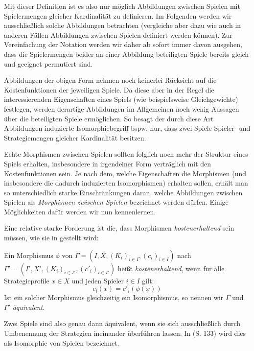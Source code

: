 \begin{beob}
	Mit dieser Definition ist es also nur möglich Abbildungen zwischen Spielen mit Spielermengen gleicher Kardinalität zu definieren. Im Folgenden werden wir ausschließlich solche Abbildungen betrachten (vergleiche aber  dazu wie auch in anderen Fällen Abbildungen zwischen Spielen definiert werden können). Zur Vereinfachung der Notation werden wir daher ab sofort immer davon ausgehen, dass die Spielermengen beider an einer Abbildung beteiligten Spiele bereits gleich und geeignet permutiert sind.
\end{beob}

Abbildungen der obigen Form nehmen noch keinerlei Rücksicht auf die Kostenfunktionen der jeweiligen Spiele. Da diese aber in der Regel die interessierenden Eigenschaften eines Spiels (wie beispielsweise Gleichgewichte) festlegen, werden derartige Abbildungen im Allgemeinen noch wenig Aussagen über die beteiligten Spiele ermöglichen. So besagt der durch diese Art Abbildungen induzierte Isomorphiebegriff bspw. nur, dass zwei Spiele Spieler- und Strategiemengen gleicher Kardinalität besitzen.

Echte Morphismen zwischen Spielen sollten folglich noch mehr der Struktur eines Spiels erhalten, insbesondere in irgendeiner Form \glqq verträglich\grqq{} mit den Kostenfunktionen sein. Je nach dem, welche Eigenschaften die Morphismen (und insbesondere die dadurch induzierten Isomorphismen) erhalten sollen, erhält man so unterschiedlich starke Einschränkungen daran, welche Abbildungen zwischen Spielen als \emph{Morphismen zwischen Spielen} bezeichnet werden dürfen. Einige Möglichkeiten dafür werden wir nun kennenlernen.

Eine relative starke Forderung ist die, dass Morphismen \emph{kostenerhaltend} sein müssen, wie sie in \cite{ReprOfFiniteGamesAsNCG} gestellt wird:

\begin{defn}
	Ein Morphismus $\phi$ von $\Gamma = (I, X, (K_i)_{i\in I}, (c_i)_{i\in I})$ nach $\Gamma' = (I', X', (K_i)_{i\in I'}, (c'_i)_{i\in I'})$ heißt \emph{kostenerhaltend}, wenn für alle Strategieprofile $x \in X$ und jeden Spieler $i \in I$ gilt:
		\[c_i(x) = c'_i(\phi(x)) \]
	Ist ein solcher Morphismus gleichzeitig ein Isomorphismus, so nennen wir $\Gamma$ und $\Gamma'$ \emph{äquivalent}.
\end{defn}

\begin{bem}
	Zwei Spiele sind also genau dann äquivalent, wenn sie sich ausschließlich durch Umbenennung der Strategien ineinander überführen lassen. In \cite{MonShap} (S. 133) wird dies als Isomorphie von Spielen bezeichnet.
\end{bem}

